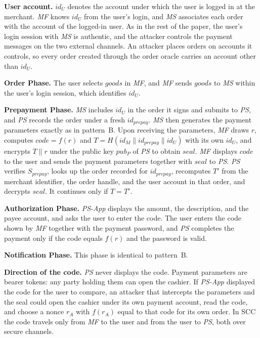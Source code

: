 \textbf{User account.}
$id_{U}$ denotes the account under which the user is logged in at the merchant.
\emph{MF} knows $id_{U}$ from the user's login, and \emph{MS} associates each order with the account of the logged-in user.
As in the rest of the paper, the user's login session with \emph{MS} is authentic, and the attacker controls the payment messages on the two external channels.
An attacker places orders on accounts it controls, so every order created through the order oracle carries an account other than $id_{U}$.

\textbf{Order Phase.}
The user selects $goods$ in \emph{MF}, and \emph{MF} sends $goods$ to \emph{MS} within the user's login session, which identifies $id_{U}$.

\textbf{Prepayment Phase.}
\emph{MS} includes $id_{U}$ in the order it signs and submits to \emph{PS}, and \emph{PS} records the order under a fresh $id_{prepay}$.
\emph{MS} then generates the payment parameters exactly as in pattern~B.
Upon receiving the parameters, \emph{MF} draws $r$, computes $code = f(r)$ and $T = H(id_{M} \parallel id_{prepay} \parallel id_{U})$ with its own $id_{U}$, and encrypts $T \parallel r$ under the public key $pub_{P}$ of \emph{PS} to obtain $seal$.
\emph{MF} displays $code$ to the user and sends the payment parameters together with $seal$ to \emph{PS}.
\emph{PS} verifies $S_{prepay}$, looks up the order recorded for $id_{prepay}$, recomputes $T'$ from the merchant identifier, the order handle, and the user account in that order, and decrypts $seal$.
It continues only if $T = T'$.

\textbf{Authorization Phase.}
\emph{PS-App} displays the amount, the description, and the payee account, and asks the user to enter the code.
The user enters the code shown by \emph{MF} together with the payment password, and \emph{PS} completes the payment only if the code equals $f(r)$ and the password is valid.

\textbf{Notification Phase.}
This phase is identical to pattern~B.

\textbf{Direction of the code.}
\emph{PS} never displays the code.
Payment parameters are bearer tokens: any party holding them can open the cashier.
If \emph{PS-App} displayed the code for the user to compare, an attacker that intercepts the parameters and the seal could open the cashier under its own payment account, read the code, and choose a nonce $r_A$ with $f(r_A)$ equal to that code for its own order.
In SCC the code travels only from \emph{MF} to the user and from the user to \emph{PS}, both over secure channels.

